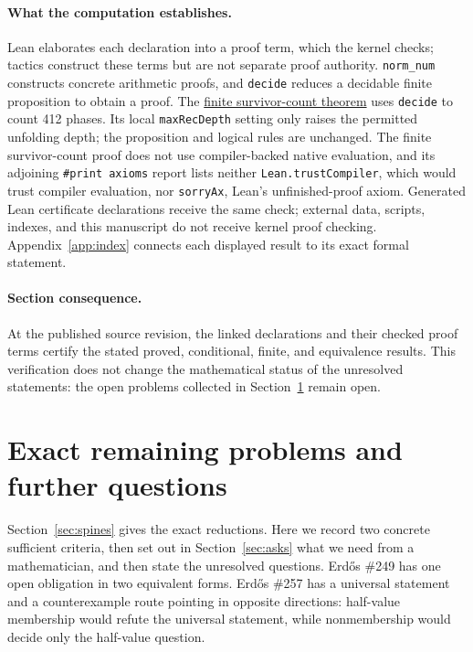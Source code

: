 \documentclass[11pt]{article}
\newcommand{\commit}{99f4bf47422abbd8757cbb22b50ba079d764d3a7}
\newcommand{\repobase}{https://github.com/wcook04/plectis-erdos/blob/\commit}
\newcommand{\PK}{Erdos249257}
\newcommand{\lword}[4]{\href{\repobase/\PK/#1\#L#2}{#4}}
\theoremstyle{definition}
\theoremstyle{remark}
\begin{document}
\paragraph{What the computation establishes.}
Lean elaborates each declaration into a proof term, which the kernel checks;
tactics construct these terms but are not separate proof authority.
\texttt{norm\_num} constructs concrete arithmetic proofs, and \texttt{decide}
reduces a decidable finite proposition to obtain a proof.  The
\lword{HalfFinalMiddlePhaseSieve.lean}{1759}{finalMiddleTwentySixPhaseSurvivors_card}{finite survivor-count theorem}
uses \texttt{decide} to count 412 phases.  Its local \texttt{maxRecDepth}
setting only raises the permitted unfolding depth; the proposition and logical
rules are unchanged.  The finite survivor-count proof does not use compiler-backed native evaluation, and
its adjoining \texttt{\#print axioms} report lists neither
\texttt{Lean.trustCompiler}, which would trust compiler evaluation, nor
\texttt{sorryAx}, Lean's unfinished-proof axiom.  Generated Lean certificate
declarations receive the same check; external data, scripts, indexes, and this
manuscript do not receive kernel proof checking.  Appendix~\ref{app:index} connects each displayed
result to its exact formal statement.

\paragraph{Section consequence.}
At the published source revision, the linked declarations and their
checked proof terms certify the stated proved, conditional, finite, and
equivalence results.  This verification does not change the mathematical status of the
unresolved statements: the open problems collected in
Section~\ref{sec:further} remain open.

\section{Exact remaining problems and further questions}\label{sec:further}

Section~\ref{sec:spines} gives the exact reductions.  Here we record two
concrete sufficient criteria, then set out in Section~\ref{sec:asks} what we
need from a mathematician, and then state the unresolved questions.
Erd\H{o}s \#249 has one open obligation in two equivalent forms.  Erd\H{o}s
\#257 has a universal statement and a counterexample route pointing in
opposite directions: half-value membership would refute the universal
statement, while nonmembership would decide only the half-value question.
\end{document}
